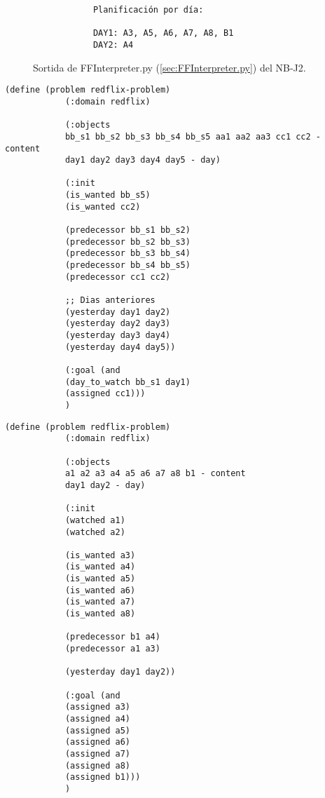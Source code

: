 \documentclass[a4paper]{article}
\begin{document}
	\begin{figure}[H]
		\centering
		\begin{verbatim}
			Planificación por día:
			
			DAY1: A3, A5, A6, A7, A8, B1
			DAY2: A4
		\end{verbatim}
		\caption{Sortida de FFInterpreter.py (\ref{sec:FFInterpreter.py}) del NB-J2.}
	\end{figure}
	
	
	
	\noindent
	\begin{minipage}[t]{0.45\textwidth}
		\begin{lstlisting}[language=PDDL, caption={Joc de Prova 1 - Nivell Bàsic}, label={lst:JP1B}]                     
			(define (problem redflix-problem)
			(:domain redflix)
			
			(:objects
			bb_s1 bb_s2 bb_s3 bb_s4 bb_s5 aa1 aa2 aa3 cc1 cc2 - content
			day1 day2 day3 day4 day5 - day)
			
			(:init
			(is_wanted bb_s5)
			(is_wanted cc2)
			
			(predecessor bb_s1 bb_s2)
			(predecessor bb_s2 bb_s3)
			(predecessor bb_s3 bb_s4)
			(predecessor bb_s4 bb_s5)
			(predecessor cc1 cc2)
			
			;; Dias anteriores
			(yesterday day1 day2)
			(yesterday day2 day3)
			(yesterday day3 day4)
			(yesterday day4 day5))
			
			(:goal (and
			(day_to_watch bb_s1 day1)
			(assigned cc1)))
			)	
		\end{lstlisting}
		
	\end{minipage}
	\hfill
	\begin{minipage}[t]{0.45\textwidth}
		\begin{lstlisting}[language=PDDL, caption={Joc de Prova 2 - Nivell Bàsic}, label={lst:JP2B}]                     
			(define (problem redflix-problem)
			(:domain redflix)
			
			(:objects
			a1 a2 a3 a4 a5 a6 a7 a8 b1 - content
			day1 day2 - day)
			
			(:init
			(watched a1)
			(watched a2)
			
			(is_wanted a3)
			(is_wanted a4)
			(is_wanted a5)
			(is_wanted a6)
			(is_wanted a7)
			(is_wanted a8)
			
			(predecessor b1 a4)
			(predecessor a1 a3)
			
			(yesterday day1 day2))
			
			(:goal (and
			(assigned a3)
			(assigned a4)
			(assigned a5)
			(assigned a6)
			(assigned a7)   
			(assigned a8)
			(assigned b1)))
			)	
		\end{lstlisting}
	\end{minipage}
	
\end{document}
